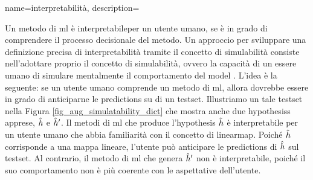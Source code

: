  {name={interpretabilità},
 	description={Un metodo di \gls{ml} è interpretabileper un
	utente umano, se è in grado di comprendere il processo decisionale del metodo. 
	Un approccio per sviluppare una definizione precisa di interpretabilità tramite il concetto di simulabilità
	consiste nell’adottare proprio il concetto di simulabilità, ovvero la capacità di un essere umano di simulare 
	mentalmente il comportamento del \gls{model} 
	\cite{doshi2017towards,hase-bansal-2020-evaluating,Chen2018,Colin2022,Lipton2018}. 
 	L’idea è la seguente: se un utente umano comprende un metodo di \gls{ml}, allora dovrebbe
	essere in grado di anticiparne le \glspl{prediction} su di un \gls{testset}. Illustriamo
	un tale \gls{testset} nella Figura \ref{fig_aug_simulatability_dict} che mostra anche
	due \glspl{hypothesis} apprese, $\hat{h}$ e $\hat{h}'$. 
	Il metodi di \gls{ml} che produce l'\gls{hypothesis} $\hat{h}$ è interpretabile
	per un utente umano che abbia familiarità con il concetto di \gls{linearmap}. 
   	Poiché $\hat{h}$ corrisponde a una mappa lineare, l’utente può
	anticipare le \glspl{prediction} di $\hat{h}$ sul 
	\gls{testset}. Al contrario, il metodo di \gls{ml} che genera $\hat{h}'$ 
	non è interpretabile, poiché il suo comportamento non è più coerente con le aspettative dell’utente.
 	\begin{figure}
 		\begin{center} 
\end{center}
\end{figure}}}
